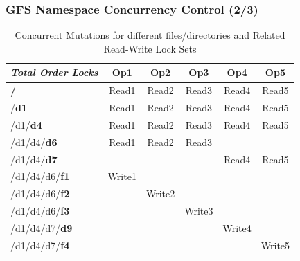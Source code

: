 \documentclass{beamer}
\begin{document}
\begin{frame}
	\frametitle{GFS Namespace Concurrency Control (2/3)}
	\begin{table}
		\centering
		\begin{tabular}{|l|c|c|c|c|c|}
			\hline
			\textbf{\textit{Total Order Locks}}            & \textbf{Op1} & \textbf{Op2} & \textbf{Op3} & \textbf{Op4} & \textbf{Op5} \\ \hline
			\textbf{\color{red}/ }           & Read1      & Read2      & Read3      & Read4      & Read5      \\ \hline
			/\textbf{\color{red}d1}          & Read1      & Read2      & Read3      & Read4      & Read5      \\ \hline
			/d1/\textbf{\color{red}d4}       & Read1      & Read2      & Read3      & Read4      & Read5      \\ \hline
			/d1/d4/\textbf{\color{red}d6}    & Read1      & Read2      & Read3      & ~          & ~          \\ \hline
			/d1/d4/\textbf{\color{red}d7}    & ~          & ~          & ~          & Read4      & Read5      \\ \hline
			/d1/d4/d6/\textbf{\color{red}f1} & Write1     & ~          & ~          & ~          & ~          \\ \hline
			/d1/d4/d6/\textbf{\color{red}f2} & ~          & Write2     & ~          & ~          & ~          \\ \hline
			/d1/d4/d6/\textbf{\color{red}f3} & ~          & ~          & Write3     & ~          & ~          \\ \hline
			/d1/d4/d7/\textbf{\color{red}d9} & ~          & ~          & ~          & Write4     & ~     \\ \hline
			/d1/d4/d7/\textbf{\color{red}f4} & ~          & ~          & ~          & ~          & Write5          \\ \hline
		\end{tabular}
		\caption{Concurrent Mutations for different files/directories and Related Read-Write Lock Sets}
	\end{table}
\end{frame}
\end{document}
